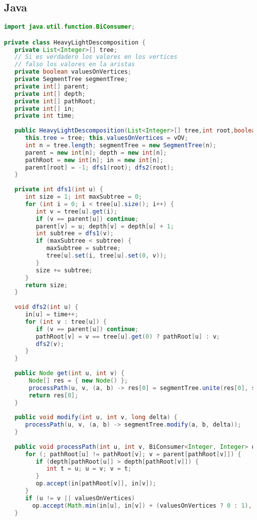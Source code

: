 \subsection{Java}
\begin{lstlisting}[language=Java]
import java.util.function.BiConsumer;	

private class HeavyLightDescomposition {
   private List<Integer>[] tree;
   // Si es verdadero los valores en los vertices
   // falso los valores en la aristas
   private boolean valuesOnVertices;
   private SegmentTree segmentTree;
   private int[] parent;
   private int[] depth;
   private int[] pathRoot;
   private int[] in;
   private int time;
	
   public HeavyLightDescomposition(List<Integer>[] tree,int root,boolean vOV){
      this.tree = tree; this.valuesOnVertices = vOV;
      int n = tree.length; segmentTree = new SegmentTree(n);
      parent = new int[n]; depth = new int[n];
      pathRoot = new int[n]; in = new int[n];
      parent[root] = -1; dfs1(root); dfs2(root);
   }
	
   private int dfs1(int u) {
      int size = 1; int maxSubtree = 0;
      for (int i = 0; i < tree[u].size(); i++) {
         int v = tree[u].get(i);
         if (v == parent[u]) continue;
         parent[v] = u; depth[v] = depth[u] + 1;
         int subtree = dfs1(v);
         if (maxSubtree < subtree) {
            maxSubtree = subtree;
            tree[u].set(i, tree[u].set(0, v));
         }
         size += subtree;
      }
      return size;
   }
	
   void dfs2(int u) {
      in[u] = time++;
      for (int v : tree[u]) {
         if (v == parent[u]) continue;
         pathRoot[v] = v == tree[u].get(0) ? pathRoot[u] : v;
         dfs2(v);
      }
   }
	
   public Node get(int u, int v) {
       Node[] res = { new Node() };
       processPath(u, v, (a, b) -> res[0] = segmentTree.unite(res[0], segmentTree.get(a, b)));
       return res[0];
   }
   
   public void modify(int u, int v, long delta) {
      processPath(u, v, (a, b) -> segmentTree.modify(a, b, delta));
   }
	
   public void processPath(int u, int v, BiConsumer<Integer, Integer> op) {
      for (; pathRoot[u] != pathRoot[v]; v = parent[pathRoot[v]]) {
         if (depth[pathRoot[u]] > depth[pathRoot[v]]) {
            int t = u; u = v; v = t;
         }
         op.accept(in[pathRoot[v]], in[v]);
      }
      if (u != v || valuesOnVertices)
        op.accept(Math.min(in[u], in[v]) + (valuesOnVertices ? 0 : 1), Math.max(in[u], in[v]));
   }
	

\end{lstlisting}
